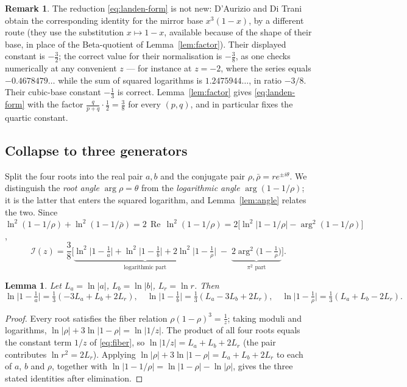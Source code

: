 \documentclass[11pt]{article}
\newtheorem{lemma}[theorem]{Lemma}
\theoremstyle{definition}
\newtheorem{remark}[theorem]{Remark}
\DeclareMathOperator{\re}{Re}
\begin{document}
\begin{remark}
The reduction \eqref{eq:landen-form} is not new: D'Aurizio and Di Trani~\cite{DaurizioDiTrani} obtain
the corresponding identity for the mirror base $x^3(1-x)$, by a different route (they use the
substitution $x\mapsto1-x$, available because of the shape of their base, in place of the
Beta-quotient of Lemma~\ref{lem:factor}). Their displayed constant is $-\tfrac32$; the correct value
for their normalisation is $-\tfrac38$, as one checks numerically at any convenient $z$ --- for
instance at $z=-2$, where the series equals $-0.4678479\ldots$ while the sum of squared logarithms is
$1.2475944\ldots$, in ratio $-3/8$. Their cubic-base constant $-\tfrac13$ is correct. Lemma~\ref{lem:factor}
gives \eqref{eq:landen-form} with the factor $\tfrac{q}{p+q}\cdot\tfrac12=\tfrac38$ for every
$(p,q)$, and in particular fixes the quartic constant.
\end{remark}

\subsection{Collapse to three generators}

Split the four roots into the real pair $a,b$ and the conjugate pair $\rho,\bar\rho=re^{\pm i\theta}$.
We distinguish the \emph{root angle} $\arg\rho=\theta$ from the \emph{logarithmic angle}
$\arg(1-1/\rho)$; it is the latter that enters the squared logarithm, and Lemma~\ref{lem:angle}
relates the two.
Since $\ln^2(1-1/\rho)+\ln^2(1-1/\bar\rho)=2\,\re\,\ln^2(1-1/\rho)
=2\big[\ln^2|1-1/\rho|-\arg^2(1-1/\rho)\big]$,
\begin{equation}\label{eq:split}
  \mathcal{I}(z)=\frac38\Big[\underbrace{\ln^2\!\big|1-\tfrac1a\big|+\ln^2\!\big|1-\tfrac1b\big|
      +2\ln^2\!\big|1-\tfrac1\rho\big|}_{\text{logarithmic part}}
  \;-\;\underbrace{2\arg^2\!\big(1-\tfrac1\rho\big)}_{\pi^2\text{ part}}\Big].
\end{equation}

\begin{lemma}\label{lem:collapse}
Let $L_a=\ln|a|$, $L_b=\ln|b|$, $L_r=\ln r$. Then
\[
  \ln\!\big|1-\tfrac1a\big|=\tfrac13(-3L_a+L_b+2L_r),\quad
  \ln\!\big|1-\tfrac1b\big|=\tfrac13(L_a-3L_b+2L_r),\quad
  \ln\!\big|1-\tfrac1\rho\big|=\tfrac13(L_a+L_b-2L_r).
\]
\end{lemma}

\begin{proof}
Every root satisfies the fiber relation $\rho(1-\rho)^3=\tfrac1z$; taking moduli and logarithms,
$\ln|\rho|+3\ln|1-\rho|=\ln|1/z|$. The product of all four roots equals the constant term
$1/z$ of \eqref{eq:fiber}, so $\ln|1/z|=L_a+L_b+2L_r$ (the pair contributes $\ln r^2=2L_r$).
Applying $\ln|\rho|+3\ln|1-\rho|=L_a+L_b+2L_r$ to each of $a$, $b$ and $\rho$, together with
$\ln|1-1/\rho|=\ln|1-\rho|-\ln|\rho|$, gives the three stated identities after elimination. \qedhere
\end{proof}
\end{document}
